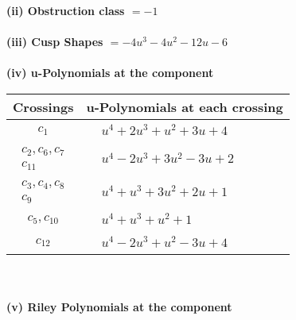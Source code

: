 \documentclass[1p]{elsarticle_modified}
\theoremstyle{definition}
\begin{document}
\flushleft \textbf{(ii) Obstruction class $= -1$}\\~\\
\flushleft \textbf{(iii) Cusp Shapes $= -4 u^3-4 u^2-12 u-6$}\\~\\
\newpage\renewcommand{\arraystretch}{1}
\flushleft \textbf{(iv) u-Polynomials at the component}\newline \\
\begin{tabular}{m{50pt}|m{274pt}}
Crossings & \hspace{64pt}u-Polynomials at each crossing \\
\hline $$\begin{aligned}c_{1}\end{aligned}$$&$\begin{aligned}
&u^4+2 u^3+u^2+3 u+4
\end{aligned}$\\
\hline $$\begin{aligned}c_{2},c_{6},c_{7}\\c_{11}\end{aligned}$$&$\begin{aligned}
&u^4-2 u^3+3 u^2-3 u+2
\end{aligned}$\\
\hline $$\begin{aligned}c_{3},c_{4},c_{8}\\c_{9}\end{aligned}$$&$\begin{aligned}
&u^4+u^3+3 u^2+2 u+1
\end{aligned}$\\
\hline $$\begin{aligned}c_{5},c_{10}\end{aligned}$$&$\begin{aligned}
&u^4+u^3+u^2+1
\end{aligned}$\\
\hline $$\begin{aligned}c_{12}\end{aligned}$$&$\begin{aligned}
&u^4-2 u^3+u^2-3 u+4
\end{aligned}$\\
\hline
\end{tabular}\\~\\
\newpage\renewcommand{\arraystretch}{1}
\flushleft \textbf{(v) Riley Polynomials at the component}\newline \\
\end{document}
